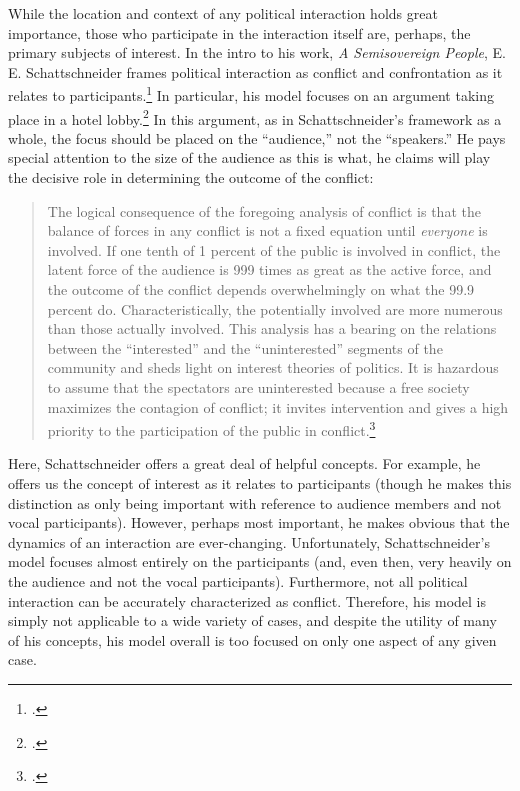 \documentclass[letterpaper,12pt]{article}
\begin{document}
While the location and context of any political interaction holds great importance, those who participate in the interaction itself are, perhaps, the primary subjects of interest. 
In the intro to his work, \emph{A Semisovereign People}, E. E. Schattschneider frames political interaction as conflict and confrontation as it relates to participants.\footcite{schattschneider75} 
In particular, his model focuses on an argument taking place in a hotel lobby.\footcite[1--5]{schattschneider75} 
In this argument, as in Schattschneider's framework as a whole, the focus should be placed on the ``audience,'' not the ``speakers.'' 
He pays special attention to the size of the audience as this is what, he claims will play the decisive role in determining the outcome of the conflict: 
\blockquote{The logical consequence of the foregoing analysis of conflict is that the balance of forces in any conflict is not a fixed equation until \emph{everyone} is involved. If one tenth of 1 percent of the public is involved in conflict, the latent force of the audience is 999 times as great as the active force, and the outcome of the conflict depends overwhelmingly on what the 99.9 percent do. Characteristically, the potentially involved are more numerous than those actually involved. This analysis has a bearing on the relations between the ``interested'' and the ``uninterested'' segments of the community and sheds light on interest theories of politics. It is hazardous to assume that the spectators are uninterested because a free society maximizes the contagion of conflict; it invites intervention and gives a high priority to the participation of the public in conflict.\footcite[5]{schattschneider75}}
Here, Schattschneider offers a great deal of helpful concepts. 
For example, he offers us the concept of interest as it relates to participants (though he makes this distinction as only being important with reference to audience members and not vocal participants). 
However, perhaps most important, he makes obvious that the dynamics of an interaction are ever-changing. 
Unfortunately, Schattschneider's model focuses almost entirely on the participants (and, even then, very heavily on the audience and not the vocal participants). 
Furthermore, not all political interaction can be accurately characterized as conflict. 
Therefore, his model is simply not applicable to a wide variety of cases, and despite the utility of many of his concepts, his model overall is too focused on only one aspect of any given case.
\end{document}
